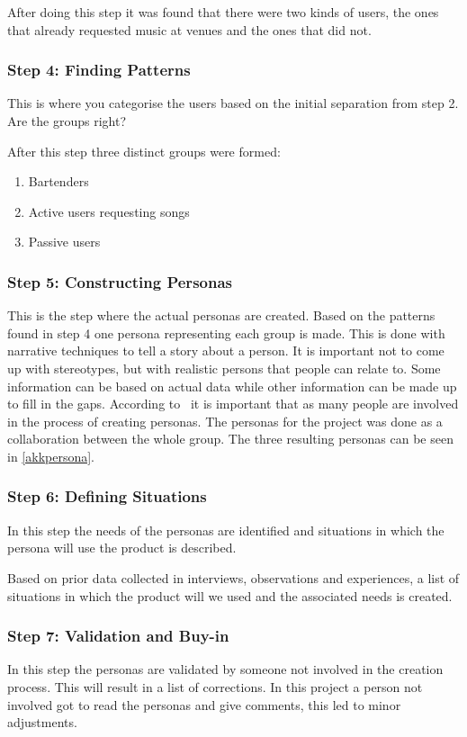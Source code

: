 After doing this step it was found that there were two kinds of users, the ones that already requested music at venues and the ones that did not.

\subsubsection{Step 4: Finding Patterns}
This is where you categorise the users based on the initial separation from step 2. Are the groups right?

After this step three distinct groups were formed:
\begin{enumerate}
    \item Bartenders
    \item Active users requesting songs
    \item Passive users
\end{enumerate}

\subsubsection{Step 5: Constructing Personas}
This is the step where the actual personas are created. Based on the patterns found in step 4 one persona representing each group is made. This is done with narrative techniques to tell a story about a person. It is important not to come up with stereotypes, but with realistic persons that people can relate to. Some information can be based on actual data while other information can be made up to fill in the gaps. According to~\cite{nielsen2007persona} it is important that as many people are involved in the process of creating personas. The personas for the project was done as a collaboration between the whole group. The three resulting personas can be seen in \cref{akkpersona}.

\subsubsection{Step 6: Defining Situations}
In this step the needs of the personas are identified and situations in which the persona will use the product is described.

Based on prior data collected in interviews, observations and experiences, a list of situations in which the product will we used and the associated needs is created.

\subsubsection{Step 7: Validation and Buy-in}
In this step the personas are validated by someone not involved in the creation process. This will result in a list of corrections. In this project a person not involved got to read the personas and give comments, this led to minor adjustments.


